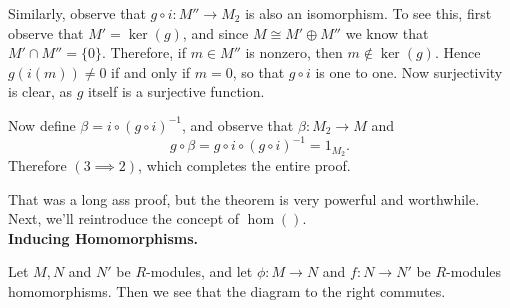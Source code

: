 \begin{prf}
\begin{description}
        Similarly, observe that $g \circ i: M'' \to M_2$ is also
        an isomorphism. To see this, first observe that $M' =
        \ker(g)$, and since $M \cong M' \oplus M''$ we know that
        $M' \cap M'' = \{0\}$. Therefore, if $m \in M''$ is
        nonzero, then $m \not\in \ker(g)$. Hence $g(i(m)) \ne 0$
        if and only if $m = 0$, so that $g \circ i$ is one to one.
        Now surjectivity is clear, as $g$ itself is a surjective
        function. 

        Now define $\beta = i \circ (g \circ i)^{-1}$, and observe
        that $\beta : M_2 \to M$ and 
        \[
            g \circ \beta = g \circ i \circ (g \circ i)^{-1} = 1_{M_2}.
        \]
        Therefore $(3 \implies 2)$, which completes the entire proof.
    \end{description}
\end{prf}

That was a long ass proof, but the theorem is very powerful and
worthwhile. Next, we'll reintroduce the concept of $\hom()$.
\\

\noindent \textbf{Inducing Homomorphisms.}

\begin{minipage}{0.6\textwidth}
    Let $M, N$ and $N'$ be $R$-modules, and let $\phi: M \to N$ and $f: N
    \to N'$ be $R$-modules homomorphisms. Then we see that
    the diagram to the right commutes.

\end{minipage}
\hfill
\begin{minipage}{0.4\textwidth}
    \begin{center}
    \end{center}
\end{minipage}
\vspace{0.5cm}

